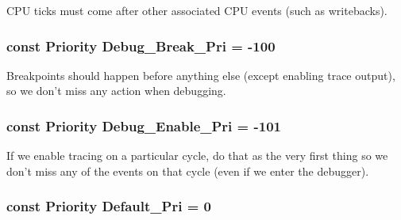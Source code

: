 \label{classEventBase_a654adc14d3292be01ccfcfc16cda2e88}
CPU ticks must come after other associated CPU events (such as writebacks). \hypertarget{classEventBase_a79f47bb016cd59600d9ed498208e1b07}{
\subsubsection[{Debug\_\-Break\_\-Pri}]{\setlength{\rightskip}{0pt plus 5cm}const {\bf Priority} {\bf Debug\_\-Break\_\-Pri} = -\/100}}
\label{classEventBase_a79f47bb016cd59600d9ed498208e1b07}
Breakpoints should happen before anything else (except enabling trace output), so we don't miss any action when debugging. \hypertarget{classEventBase_a55b52d71f23a2cf65f4ebfbfe09fef1e}{
\subsubsection[{Debug\_\-Enable\_\-Pri}]{\setlength{\rightskip}{0pt plus 5cm}const {\bf Priority} {\bf Debug\_\-Enable\_\-Pri} = -\/101}}
\label{classEventBase_a55b52d71f23a2cf65f4ebfbfe09fef1e}
If we enable tracing on a particular cycle, do that as the very first thing so we don't miss any of the events on that cycle (even if we enter the debugger). \hypertarget{classEventBase_a6bd0fef0ad63ee49ad5ece92a9dd5f8f}{
\subsubsection[{Default\_\-Pri}]{\setlength{\rightskip}{0pt plus 5cm}const {\bf Priority} {\bf Default\_\-Pri} = 0}}
\label{classEventBase_a6bd0fef0ad63ee49ad5ece92a9dd5f8f}


